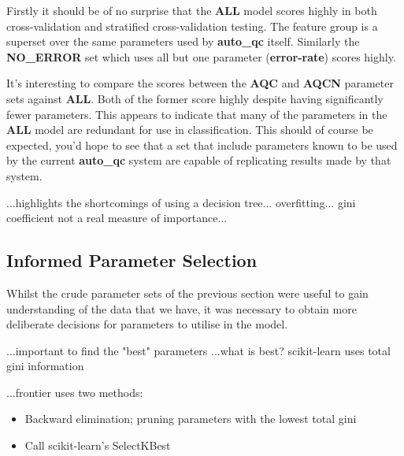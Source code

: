 Firstly it should be of no surprise that the \textbf{ALL} model scores highly in
both cross-validation and stratified cross-validation testing. The feature group
is a superset over the same parameters used by \textbf{auto\_qc} itself.
Similarly the \textbf{NO\_ERROR} set which uses all but one parameter
(\textbf{error-rate}) scores highly.

It's interesting to compare the scores between the \textbf{AQC} and
\textbf{AQCN} parameter sets against \textbf{ALL}. Both of the former score
highly despite having significantly fewer parameters. This appears to indicate
that many of the parameters in the \textbf{ALL} model are redundant for use in
classification. This should of course be expected, you'd hope to see that a set
that include parameters known to be used by the current \textbf{auto\_qc} system
are capable of replicating results made by that system.



...highlights the shortcomings of using a decision tree...
overfitting... gini coefficient not a real measure of importance...

\subsection{Informed Parameter Selection}

Whilst the crude parameter sets of the previous section were useful to gain
understanding of the data that we have, it was necessary to obtain more
deliberate decisions for parameters to utilise in the model.

...important to find the "best" parameters
...what is best? scikit-learn uses total gini information

...frontier uses two methods:
\begin{itemize}
    \item Backward elimination; pruning parameters with the lowest total gini
    \item Call scikit-learn's SelectKBest
\end{itemize}

